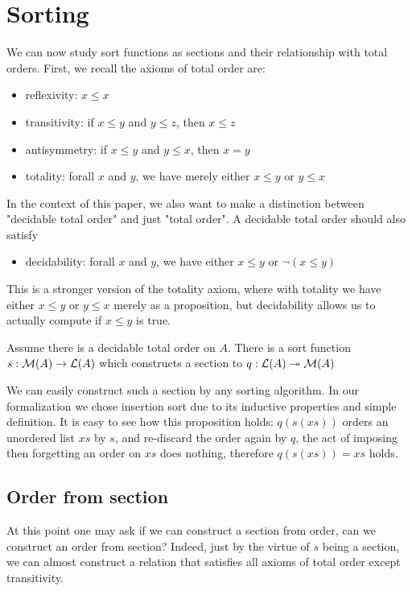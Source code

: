 \section{Sorting}
\label{sec:sorting}

We can now study sort functions as sections and their relationship with total orders.
First, we recall the axioms of total order are:
\begin{itemize}
    \item reflexivity: $x \leq x$
    \item transitivity: if $x \leq y$ and $y \leq z$, then $x \leq z$
    \item antisymmetry: if $x \leq y$ and $y \leq x$, then $x = y$
    \item totality: forall $x$ and $y$, we have merely either $x \leq y$ or $y \leq x$ 
\end{itemize}

In the context of this paper, we also want to make a distinction between "decidable total order"
and just "total order". A decidable total order should also satisfy
\begin{itemize}
    \item decidability: forall $x$ and $y$, we have either $x \leq y$ or $\neg(x \leq y)$ 
\end{itemize}

This is a stronger version of the totality axiom, where with totality we have 
either $x \leq y$ or $y \leq x$ merely as a proposition, but decidability allows us to actually
compute if $x \leq y$ is true.

\begin{proposition}
Assume there is a decidable total order on $A$. There is a sort function $s: \mathcal{M}(A) \to \mathcal{L}(A)$
which constructs a section to $q : \mathcal{L}(A) \twoheadrightarrow \mathcal{M}(A)$
\end{proposition}

We can easily construct such a section by any sorting algorithm. In our formalization we chose
insertion sort due to its inductive properties and simple definition. It is easy to see how this
proposition holds: $q(s(xs))$ orders an unordered list $xs$ by $s$, and re-discard the order again by
$q$, the act of imposing then forgetting an order on $xs$ does nothing, therefore $q(s(xs)) = xs$ holds.

\subsection{Order from section}
At this point one may ask if we can construct a section from order, can we construct an order from section?
Indeed, just by the virtue of $s$ being a section, we can almost construct a relation that satisfies
all axioms of total order except transitivity. 

